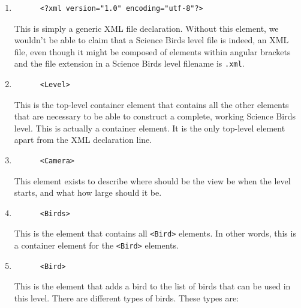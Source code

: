 \documentclass{dalthesis}
\begin{document}
\begin{enumerate}
  \begin{enumerate}
    \item

    \begin{lstlisting}
      <?xml version="1.0" encoding="utf-8"?>
    \end{lstlisting}

    This is simply a generic XML file declaration. Without this element, we wouldn't be able to claim that a Science Birds level file is indeed, an XML file, even though it might be composed of elements within angular brackets and the file extension in a Science Birds level filename is \lstinline{.xml}.

    \item

    \begin{lstlisting}
      <Level>
    \end{lstlisting}

    This is the top-level container element that contains all the other elements that are necessary to be able to construct a complete, working Science Birds level. This is actually a container element. It is the only top-level element apart from the XML declaration line.

    \item

    \begin{lstlisting}
      <Camera>
    \end{lstlisting}

    This element exists to describe where should be the view be when the level starts, and what how large should it be.

    \item

    \begin{lstlisting}
      <Birds>
    \end{lstlisting}

    This is the element that contains all \lstinline{<Bird>} elements. In other words, this is a container element for the \lstinline{<Bird>} elements.

    \item

    \begin{lstlisting}
      <Bird>
    \end{lstlisting}

    This is the element that adds a bird to the list of birds that can be used in this level. There are different types of birds. These types are:


\end{enumerate}
\end{enumerate}
\end{document}

